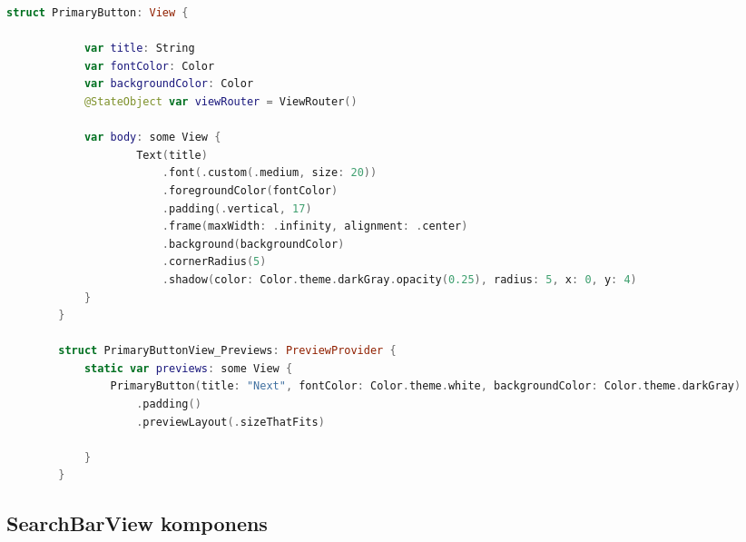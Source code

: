 \begin{spacing}{2}
\end{spacing}
\begin{minipage}{\textwidth}
    \linespread{0.8}\selectfont
    \begin{lstlisting}[language=swift]
        struct PrimaryButton: View {
    
            var title: String
            var fontColor: Color
            var backgroundColor: Color
            @StateObject var viewRouter = ViewRouter()
            
            var body: some View {
                    Text(title)
                        .font(.custom(.medium, size: 20))
                        .foregroundColor(fontColor)
                        .padding(.vertical, 17)
                        .frame(maxWidth: .infinity, alignment: .center)
                        .background(backgroundColor)
                        .cornerRadius(5)
                        .shadow(color: Color.theme.darkGray.opacity(0.25), radius: 5, x: 0, y: 4)
            }
        }
        
        struct PrimaryButtonView_Previews: PreviewProvider {
            static var previews: some View {
                PrimaryButton(title: "Next", fontColor: Color.theme.white, backgroundColor: Color.theme.darkGray)
                    .padding()
                    .previewLayout(.sizeThatFits)
                
            }
        }
    \end{lstlisting}   
\end{minipage} 


\subsection*{SearchBarView komponens}

